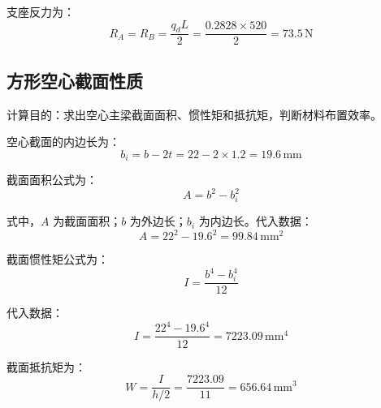 \documentclass[UTF8,a4paper,12pt,fontset=none]{ctexart}
\numberwithin{equation}{section}
\numberwithin{figure}{section}
\numberwithin{table}{section}
\newcommand{\mm}{\,\mathrm{mm}}
\newcommand{\Nunit}{\,\mathrm{N}}
\begin{document}
支座反力为：
\begin{equation}
  R_A=R_B=\frac{q_dL}{2}=\frac{0.2828\times520}{2}=73.5\Nunit
\end{equation}

\subsection{方形空心截面性质}
计算目的：求出空心主梁截面面积、惯性矩和抵抗矩，判断材料布置效率。

空心截面的内边长为：
\begin{equation}
  b_i=b-2t=22-2\times1.2=19.6\mm
\end{equation}

截面面积公式为：
\begin{equation}
  A=b^2-b_i^2
\end{equation}

式中，$A$ 为截面面积；$b$ 为外边长；$b_i$ 为内边长。代入数据：
\begin{equation}
  A=22^2-19.6^2=99.84\mm^2
\end{equation}

截面惯性矩公式为：
\begin{equation}
  I=\frac{b^4-b_i^4}{12}
\end{equation}

代入数据：
\begin{equation}
  I=\frac{22^4-19.6^4}{12}=7223.09\mm^4
\end{equation}

截面抵抗矩为：
\begin{equation}
  W=\frac{I}{h/2}=\frac{7223.09}{11}=656.64\mm^3
\end{equation}
\end{document}
